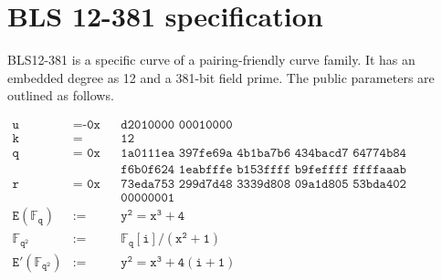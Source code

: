 \documentclass[11pt]{article}
\begin{document}
\appendix
\section{BLS 12-381 specification}
BLS12-381 is a specific curve of a pairing-friendly curve family. It has an embedded degree as 12 and a 381-bit field prime. The public parameters are outlined as follows\cite{sean2017bls}.

\begin{align*}
\texttt{u} &= \texttt{-0x} && \texttt{d2010000 00010000} \\
\texttt{k} &= &&\texttt{12} \\
\texttt{q} &= \texttt{ 0x} && \texttt{1a0111ea 397fe69a 4b1ba7b6 434bacd7 64774b84 f38512bf 6730d2a0} \\
& && \texttt{f6b0f624 1eabfffe b153ffff b9feffff ffffaaab} \\
\texttt{r} &= \texttt{ 0x} && \texttt{73eda753 299d7d48 3339d808 09a1d805 53bda402 fffe5bfe ffffffff}\\
& && \texttt{00000001} \\
\mathtt{E(\mathbb{F}_q)} &:= &&\mathtt{y^2 = x^3 + 4} \\
\mathtt{\mathbb{F}_{q^2}} &:= &&\mathtt{\mathbb{F}_q[i]/(x^2 + 1)} \\
\mathtt{E'(\mathbb{F}_{q^2})} &:= &&\mathtt{y^2 = x^3 + 4(i + 1)} \\
\end{align*}


\end{document}
